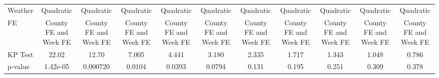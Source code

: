 \begin{tabular}{lcccccccccc}
Weather & Quadratic & Quadratic & Quadratic & Quadratic & Quadratic & Quadratic & Quadratic & Quadratic & Quadratic & Quadratic \\
FE & County FE and Week FE & County FE and Week FE & County FE and Week FE & County FE and Week FE & County FE and Week FE & County FE and Week FE & County FE and Week FE & County FE and Week FE & County FE and Week FE & County FE and Week FE \\
KP Test & 22.02 & 12.70 & 7.005 & 4.441 & 3.180 & 2.335 & 1.717 & 1.343 & 1.048 & 0.786 \\
 p-value & 1.42e-05 & 0.000720 & 0.0104 & 0.0393 & 0.0794 & 0.131 & 0.195 & 0.251 & 0.309 & 0.378 \\ \hline
\end{tabular}

